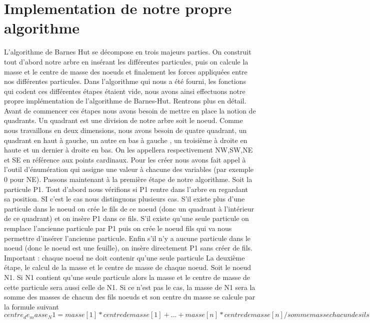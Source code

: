 \section{Implementation de notre propre algorithme}
L'algorithme de Barnes Hut se décompose en trois majeurs parties. On construit tout d'abord notre arbre en insérant les différentes particules, puis on calcule la masse et le centre de masse des noeuds et finalement les forces appliquées entre nos différentes particules. Dans l'algorithme qui nous a été fourni, les fonctions qui codent ces différentes étapes étaient vide, nous avons ainsi effectuons notre propre implémentation de l'algorithme de Barnes-Hut. Rentrons plus en détail.
\newline
Avant de commencer ces étapes nous avons besoin de mettre en place la notion de quadrants. Un quadrant est une division de notre arbre soit le noeud. Comme nous travaillons en deux dimensions, nous avons besoin de quatre quadrant, un quadrant en haut à gauche, un autre en bas à gauche , un troisième à droite en haute et un dernier à droite en bas. On les appellera respectivement NW,SW,NE et SE en référence aux points cardinaux. Pour les créer nous avons fait appel à l'outil d'énumération qui assigne une valeur à chacune des variables (par exemple 0 pour NE).
\newline
Passons maintenant à la première étape de notre algorithme.
\newline
Soit la particule P1. Tout d'abord nous vérifions si P1 rentre dans l'arbre en regardant sa position.
SI c'est le cas nous distinguons plusieurs cas. S'il existe plus d'une particule dans le noeud on crée le fils de ce noeud (donc un quadrant à l'intérieur de ce quadrant) et on insère P1 dans ce fils. S'il existe qu'une seule particule on remplace l'ancienne particule par P1 puis on crée le noeud fils qui va nous permettre d'insérer l'ancienne particule. Enfin s'il n'y a aucune particule dans le noeud (donc le noeud est une feuille), on insère directement P1 sans créer de fils.
Important : chaque noeud ne doit contenir qu'une seule particule
\newline
La deuxième étape, le calcul de la masse et le centre de masse de chaque noeud.
\newline
Soit le noeud N1. Si N1 contient qu'une seule particule alors la masse et le centre de masse de cette particule sera aussi celle de N1. Si ce n'est pas le cas, la masse de N1 sera la somme des masses de chacun des fils noeuds et son centre du masse se calcule par la formule suivant
\begin{equation}
    centre_de_masse_N1=masse[1]*centredemasse[1] +...+ masse[n]*centredemasse[n]/sommemassechacundes ils
\end{equation}
